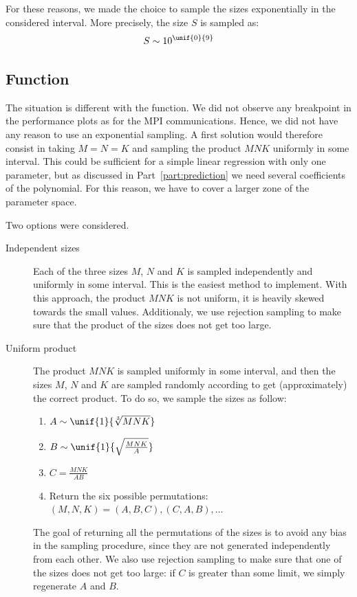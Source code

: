             For these reasons, we made the choice to sample the sizes exponentially in the considered interval. More
            precisely, the size $S$ is sampled as: \[S\sim10^{\unif{0}{9}}\]

        \subsection{Function \dgemm}%

            The situation is different with the \dgemm function. We did not observe any breakpoint in the performance
            plots as for the MPI communications. Hence, we did not have any reason to use an exponential sampling. A
            first solution would therefore consist in taking \(M=N=K\) and sampling the product \(MNK\) uniformly in
            some interval.  This could be sufficient for a simple linear regression with only one parameter, but as
            discussed in Part~\ref{part:prediction} we need several coefficients of the polynomial. For this reason, we
            have to cover a larger zone of the parameter space.

            Two options were considered.
            \begin{description}
                \item[Independent sizes] Each of the three sizes \(M\), \(N\) and \(K\) is sampled independently and
                    uniformly in some interval. This is the easiest method to implement. With this approach, the product
                    \(MNK\) is not uniform, it is heavily skewed towards the small values. Additionaly, we use rejection
                    sampling to make sure that the product of the sizes does not get too large.
                \item[Uniform product] The product \(MNK\) is sampled uniformly in some interval, and then the sizes
                    \(M\), \(N\) and \(K\) are sampled randomly according to get (approximately) the correct product.
                    To do so, we sample the sizes as follow:
                    \begin{enumerate}
                        \item \(A \sim \unif{1}{\sqrt[3]{MNK}}\)
                        \item \(B \sim \unif{1}{\sqrt{\frac{MNK}{A}}}\)
                        \item \(C = \frac{MNK}{AB}\)
                        \item Return the six possible permutations: \((M,N,K) = (A,B,C), (C,A,B), \dots\)
                    \end{enumerate}
                    The goal of returning all the permutations of the sizes is to avoid any bias in the sampling
                    procedure, since they are not generated independently from each other. We also use rejection
                    sampling to make sure that one of the sizes does not get too large: if \(C\) is greater than some
                    limit, we simply regenerate \(A\) and \(B\).
            \end{description}


